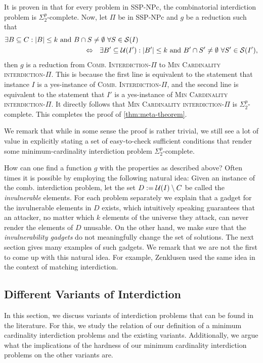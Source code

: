 It is proven in \cite{gruene2024completeness} that for every problem in SSP-NPc, the combinatorial interdiction problem is $\Sigma^p_2$-complete.
Now, let $\Pi$ be in SSP-NPc and $g$ be a reduction such that
    \begin{align*}
         \exists B \subseteq C : |B| \leq k \text{ and } B \cap S \neq \emptyset \ \forall S \in \mathcal{S}(I) \qquad\qquad\qquad\qquad\qquad\qquad\qquad\qquad\quad\\
         \Leftrightarrow \ \ \exists B' \subseteq \mathcal{U}(I') : |B'| \leq k \text{ and } B' \cap S' \neq \emptyset \ \forall S' \in \mathcal{S}(I'),
     \end{align*}
then $g$ is a reduction from \textsc{Comb. Interdiction-$\Pi$} to \textsc{Min Cardinality interdiction-$\Pi$}. This is because the first line is equivalent to the statement that instance $I$ is a yes-instance of \textsc{Comb. Interdiction-$\Pi$}, and the second line is equivalent to the statement that $I'$ is a yes-instance of \textsc{Min Cardinality interdiction-$\Pi$}.
It directly follows that \textsc{Min Cardinality interdiction-$\Pi$} is $\Sigma^p_2$-complete. This completes the proof of \cref{thm:meta-theorem}. 

We remark that while in some sense the proof is rather trivial, we still see a lot of value in explicitly stating a set of easy-to-check sufficient conditions that render some minimum-cardinality interdiction problem $\Sigma^p_2$-complete.

How can one find a function $g$ with the properties as described above? Often times it is possible by employing the following natural idea:
Given an instance of the comb. interdiction problem, let the set $D := \mathcal{U}(I) \setminus C$ be called the \emph{invulnerable} elements. 
For each problem separately we explain that a gadget for the invulnerable elements in $D$ exists, which
intuitively speaking guarantees that an attacker, no matter which $k$ elements of the universe they attack, can never render the elements of $D$ unusable.
On the other hand, we make sure that the \emph{invulnerability gadgets} do not meaningfully change the set of solutions.
The next section gives many examples of such gadgets.
We remark that we are not the first to come up with this natural idea.
For example, Zenklusen \cite{DBLP:journals/dam/Zenklusen10a} used the same idea in the context of matching interdiction.

\subsection{Different Variants of Interdiction}
\label{sec:different-variants-of-interdiction}
In this section, we discuss variants of interdiction problems that can be found in the literature.
For this, we study the relation of our definition of a minimum cardinality interdiction problems and the existing variants.
Additionally, we argue what the implications of the hardness of our minimum cardinality interdiction problems on the other variants are.

